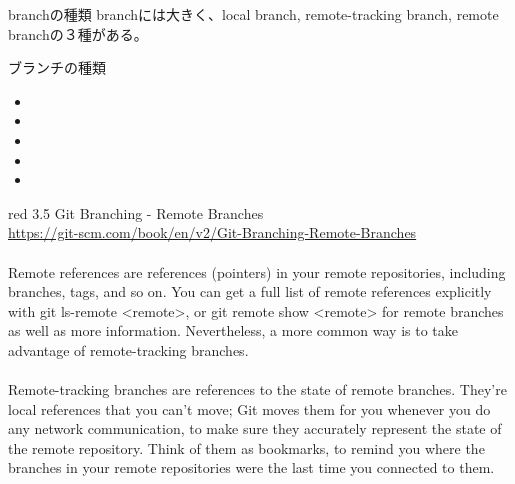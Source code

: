 \documentclass[11pt,a4paper,openany,dvipdfmx]{jsarticle}
\begin{document}
\begin{oceanbox}{branchの種類}
branchには大きく、local branch, remote-tracking branch, remote branchの３種がある。
\end{oceanbox}


ブランチの種類
\begin{tcolorbox}[colframe=Cyan]
  \begin{multicols}{2}
    \begin{itemize}
        \item {}
        \item {}
        \item {}
        \item {}
        \item {}
    \end{itemize}
  \end{multicols}
\end{tcolorbox}


\begin{ColorReferenceBox}{red}
3.5 Git Branching - Remote Branches\\
\url{https://git-scm.com/book/en/v2/Git-Branching-Remote-Branches}\\
\\
Remote references are references (pointers) in your remote repositories, including branches, tags, and so on. You can get a full list of remote references explicitly with git ls-remote <remote>, or git remote show <remote> for remote branches as well as more information. Nevertheless, a more common way is to take advantage of remote-tracking branches.\\
\\
Remote-tracking branches are references to the state of remote branches. They’re local references that you can’t move; Git moves them for you whenever you do any network communication, to make sure they accurately represent the state of the remote repository. Think of them as bookmarks, to remind you where the branches in your remote repositories were the last time you connected to them.\\
\end{ColorReferenceBox}
\end{document}
